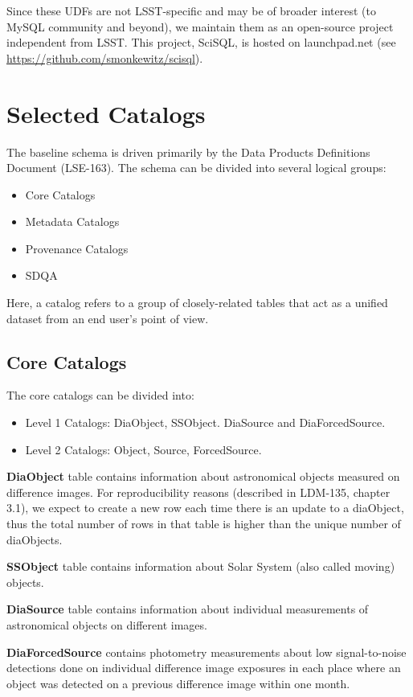 \documentclass[DM,lsstdraft,toc]{lsstdoc}
\begin{document}
Since these UDFs are not LSST-specific and may be of broader interest (to MySQL community and beyond), we maintain them as an open-source project independent from LSST. This project, SciSQL, is hosted on launchpad.net (see \url{https://github.com/smonkewitz/scisql}).

\section{Selected Catalogs}

The baseline schema is driven primarily by the Data Products Definitions Document (LSE-163). The schema can be divided into several logical groups:

\begin{itemize}
  \item Core Catalogs
  \item Metadata Catalogs
  \item Provenance Catalogs
  \item SDQA
\end{itemize}

Here, a catalog refers to a group of closely-related tables that act as a unified dataset from an end user's point of view.

\subsection{Core Catalogs}

The core catalogs can be divided into:
\begin{itemize}
  \item Level 1 Catalogs: DiaObject, SSObject. DiaSource and DiaForcedSource.
  \item Level 2 Catalogs: Object, Source, ForcedSource.
\end{itemize}

\textbf{DiaObject} table contains information about astronomical objects measured on difference images. For reproducibility reasons (described in LDM-135, chapter 3.1), we expect to create a new row each time there is an update to a diaObject, thus the total number of rows in that table is higher than the unique number of diaObjects. 

\textbf{SSObject} table contains information about Solar System (also called moving) objects.

\textbf{DiaSource} table contains information about individual measurements of astronomical objects on different images.

\textbf{DiaForcedSource} contains photometry measurements about low signal-to-noise detections done on individual difference image exposures in each place where an object was detected on a previous difference image within one month.
\end{document}
